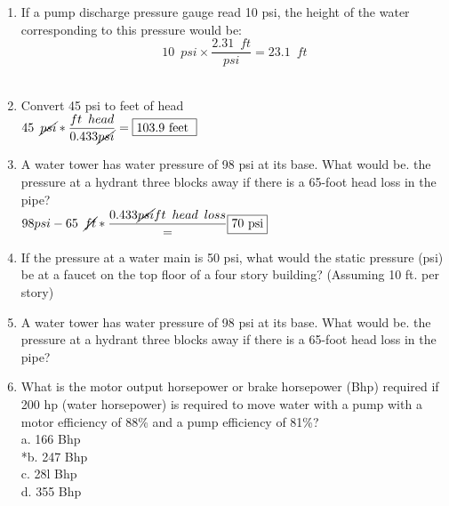 \documentclass{article}
\begin{document}
\begin{enumerate}

\vspace{0.4cm}

\item If a pump discharge pressure gauge read 10 psi, the height of the water corresponding to this pressure would be:
$$10 \enspace psi \times \dfrac{2.31 \enspace ft}{psi}=23.1 \enspace ft$$\\
\vspace{0.4cm}



\item Convert 45 psi to feet of head\\

 \vspace{0.4cm}
$
45 \enspace \cancel{psi}*\dfrac{ft \enspace head}{0.433\cancel{psi}}=\boxed{103.9 \text { feet }}
$
 


\item A water tower has water pressure of 98 psi at its base. What would be. the pressure at a hydrant three blocks away if there is a 65-foot head loss in the pipe?\\
 \vspace{0.4cm}
$
98 psi - 65 \enspace \cancel{ft}*\dfrac{0.433\cancel{psi}{ft \enspace head \enspace loss}}=\boxed{70 \text { psi}}
$
\item If the pressure at a water main is 50 psi, what would the static pressure (psi) be at a faucet on the top floor of a four story building? (Assuming 10 ft. per story)

\item A water tower has water pressure of 98 psi at its base. What would be. the pressure at a hydrant three blocks away if there is a 65-foot head loss in the pipe?\\






\item What is the motor output horsepower or brake horsepower (Bhp) required if 200 hp (water horsepower) is required to move water with a pump with a motor efficiency of 88\% and a pump efficiency of 81\%?\\
a.	166 Bhp\\
*b.	247 Bhp\\
c.	28l Bhp\\
d.	355 Bhp\\




\end{enumerate}
\end{document}

